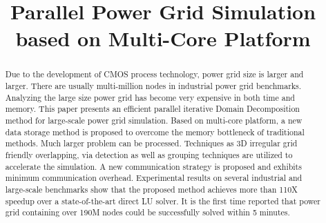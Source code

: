 \documentclass{sig-alternate}
\begin{document}
\title{Parallel Power Grid Simulation based on Multi-Core Platform}

\maketitle

\begin{comment}
This paper presents an efficient parallel Domain Decomposition method for large-scale power grid simulation. 
Based on multi-core platform, a new data storage strategy is proposed to overcome the memory bottleneck of traditional methods. 
Techniques as 3D irregular grid friendly overlapping, via detection as well as grouping techniques are utilized to accelerate the 
simulation. A new communication strategy is proposed and exhibits minimum communication overhead. Experimental results on several 
industrial and large-scale benchmarks show that the proposed method achieves more than 110X speedup over a state-of-the-art direct 
LU solver. Power grid containing over 190M nodes could be solved within 5 minutes.
\end{comment}

\begin{abstract}
Due to the development of CMOS process technology, power grid size is larger and larger. There are usually multi-million nodes in 
industrial power grid benchmarks. Analyzing the large size power grid has become very expensive in both time and memory. This paper presents 
an efficient parallel iterative Domain Decomposition method for large-scale power grid simulation. Based on multi-core platform, a new 
data storage method is proposed to overcome the memory bottleneck of traditional methods. Much larger problem can be processed. 
Techniques as 3D irregular grid friendly overlapping, via detection as well as grouping techniques are utilized to accelerate the 
simulation. A new communication strategy is proposed and exhibits minimum communication overhead. Experimental results on several 
industrial and large-scale benchmarks show that the proposed method achieves more than 110X speedup over a state-of-the-art direct 
LU solver. It is the first time reported that power grid containing over 190M nodes could be successfully solved within 5 minutes.	
\end{abstract}
\end{document}
